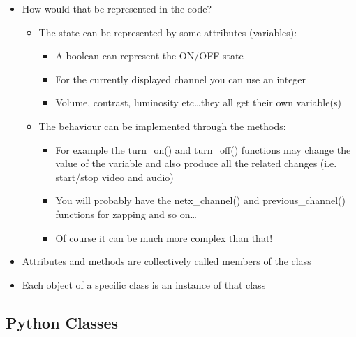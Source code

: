   \begin{itemize}
    \item How would that be represented in the code?
    \smallskip
      \begin{itemize}
      \item The state can be represented by some \alert{attributes} (variables):
      \begin{itemize}
        \item A boolean can represent the ON/OFF state
        \item For the currently displayed channel you can use an integer
        \item Volume, contrast, luminosity etc\dots they all get their own variable(s)
      \end{itemize}

      \medskip
    
      \item The behaviour can be implemented through the \alert{methods}:
      \smallskip
      \begin{itemize}
        \item For example the turn\_on() and turn\_off() functions may change the value of the variable
              and also produce all the related changes (i.e. start/stop video and audio) 
        \item You will probably have the netx\_channel() and previous\_channel() functions for zapping and so on\dots
        \item Of course it can be much more complex than that!
      \end{itemize}
    \end{itemize}
    
    \medskip
    
    \item Attributes and methods are collectively called \alert{members} of the class
    \medskip
    \item Each object of a specific class is an \alert{instance} of that class
  \end{itemize}



\subsection{Python Classes}

